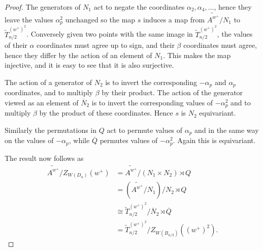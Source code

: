 \documentclass[10pt,a4paper]{amsart}
\def\TSpinn{\coveringtorus_{n/2}}
\def\coveringtorus{\tilde{T}}
\def\wplus{w^+}
\begin{document}
\begin{proof}
The generators of $N_1$ act to negate the coordinates $\alpha_2,\alpha_4,\dots$, hence they leave the values $\alpha_p^2$ unchanged so the map $s$ induces a map from $\widetilde{A^{\wplus}}/N_1$ to $\TSpinn^{(\wplus)^2}$.  Conversely given two points with the same image in $\TSpinn^{(\wplus)^2}$, the values of their $\alpha$ coordinates must agree up to sign, and their $\beta$ coordinates must agree, hence they differ by the action of an element of $N_1$.  This makes the map injective, and it is easy to see that it is also surjective.

The action of a generator of $N_2$ is to invert the corresponding $-\alpha_p$ and $\alpha_p$ coordinates, and to multiply $\beta$ by their product.  The action of the generator viewed as an element of $\overline{N}_2$ is to invert the corresponding values of $-\alpha_p^2$ and to multiply $\beta$ by the product of these coordinates.  Hence $s$ is $N_2$ equivariant.

Similarly the permutations in $Q$ act to permute values of $\alpha_p$ and in the same way on the values of $-\alpha_p$, while $\overline{Q}$ permutes values of $-\alpha_p^2$.  Again this is equivariant.

The result now follows as
\begin{align*}
\widetilde{A^{\wplus}}/Z_{W(D_n)}(\wplus) &= \widetilde{A^{\wplus}}/(N_1\times N_2)\rtimes Q\\
&=(\widetilde{A^{\wplus}}/N_1) /N_2\rtimes Q\\
&\cong \TSpinn
    ^{(\wplus)^2} / \overline{N}_2\rtimes \overline{Q}\\
    &= \TSpinn
    ^{(\wplus)^2} /Z_{W(B_{n/2})}((\wplus)^2).
\end{align*}
\end{proof}
\end{document}
